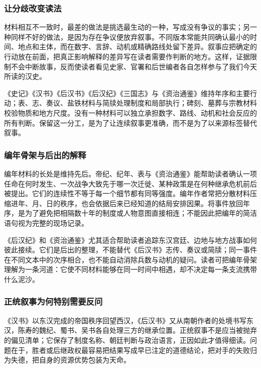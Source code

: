 \subsubsection{让分歧改变读法}

材料相互不一致时，最差的做法是挑选最生动的一种，写成没有争议的事实；另一种同样不好的做法，是因为存在争议便放弃叙事。不同版本常能共同确认最小的时间、地点和主体，而在数字、言辞、动机或精确路线处留下差异。叙事应把确定的行动放在前面，把真正影响解释的差异写在读者需要作判断的地方。这样，证据限制不会中断故事，反而使读者看见史家、官署和后世编者各自怎样参与了我们今天所读的汉史。

\begin{sourcenote}[材料的分工]
《史记》《汉书》《后汉书》《后汉纪》《三国志》与《资治通鉴》维持年序和主要行动；表、志、奏议、盐铁材料与简牍处理制度和局部执行；碑刻、墓葬与宗教材料校验物质和地方尺度。没有一种材料可以独立承担数字、路线、动机和社会反应的所有判断。保留这一分工，是为了让连续叙事更准确，而不是为了以来源标签替代叙事。
\end{sourcenote}

\subsubsection{编年骨架与后出的解释}

编年材料的长处是维持先后。帝纪、纪年、表与《资治通鉴》能帮助读者确认一项任命在何时发生、一次战争大致先于哪一次迁徙、某种政策是在何种继承危机前后被提出。它们的连续性不等于每一个细节都有同等强度。编年作者常把分散材料压缩进年、月、日的秩序，也会依据后来已经知道的结局安排因果。将事件放回年序，是为了避免把相隔数十年的制度或人物意图直接相连；不能因此把编年的简洁语句视为完整的现场记录。

《后汉纪》和《资治通鉴》尤其适合帮助读者追踪东汉宫廷、边地与地方战事如何彼此接续。它们是后出的整理，不能替代《后汉书》志传、奏议或简牍；同一事件在不同文本中的次序相合，也不能自动消除兵数与动机的疑问。读者可把编年骨架理解为一条河道：它使不同材料能够在同一时间中相遇，却不决定每一条支流携带什么泥沙。

\subsubsection{正统叙事为何特别需要反问}

《汉书》以东汉完成的帝国秩序回望西汉，《后汉书》又从南朝作者的处境书写东汉，陈寿的魏纪、蜀书、吴书各自处理三方的继承位置。正统叙事不是应当被抛弃的偏见清单；它保存了制度名称、朝廷判断与政治语言，正因如此才值得细读。问题在于，胜者或后继政权最容易把结果写成早已注定的道德结论，把对手的失败归为失德，把自身的资源优势包装为天命。


